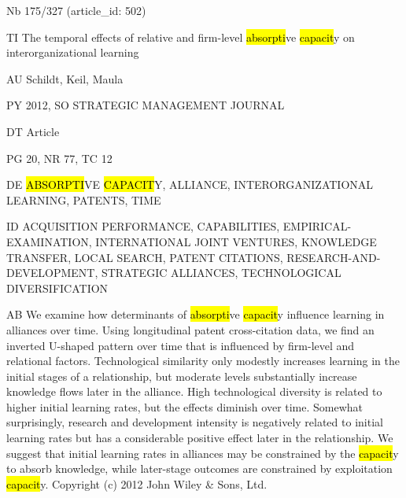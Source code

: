 \documentclass[a4paper]{article}
\begin{document}
\vspace*{-2cm}
Nb \tabto{0cm}175/327 (article\_id: 502)\par
TI \tabto{0cm}The temporal effects of relative and firm-level \hl{absorpti}ve \hl{capacit}y on interorganizational learning\par
AU \tabto{0cm}Schildt, Keil, Maula\par
PY \tabto{0cm}2012, SO STRATEGIC MANAGEMENT JOURNAL\par
DT \tabto{0cm}Article\par
PG \tabto{0cm}20, NR 77, TC 12\par
DE \tabto{0cm}\hl{ABSORPTI}VE \hl{CAPACIT}Y, ALLIANCE, INTERORGANIZATIONAL LEARNING, PATENTS, TIME\par
ID \tabto{0cm}ACQUISITION PERFORMANCE, CAPABILITIES, EMPIRICAL-EXAMINATION, INTERNATIONAL JOINT VENTURES, KNOWLEDGE TRANSFER, LOCAL SEARCH, PATENT CITATIONS, RESEARCH-AND-DEVELOPMENT, STRATEGIC ALLIANCES, TECHNOLOGICAL DIVERSIFICATION\par
AB \tabto{0cm}We examine how determinants of \hl{absorpti}ve \hl{capacit}y influence learning in alliances over time. Using longitudinal patent cross-citation data, we find an inverted U-shaped pattern over time that is influenced by firm-level and relational factors. Technological similarity only modestly increases learning in the initial stages of a relationship, but moderate levels substantially increase knowledge flows later in the alliance. High technological diversity is related to higher initial learning rates, but the effects diminish over time. Somewhat surprisingly, research and development intensity is negatively related to initial learning rates but has a considerable positive effect later in the relationship. We suggest that initial learning rates in alliances may be constrained by the \hl{capacit}y to absorb knowledge, while later-stage outcomes are constrained by exploitation \hl{capacit}y. Copyright (c) 2012 John Wiley \& Sons, Ltd.\par
\clearpage
\end{document}
